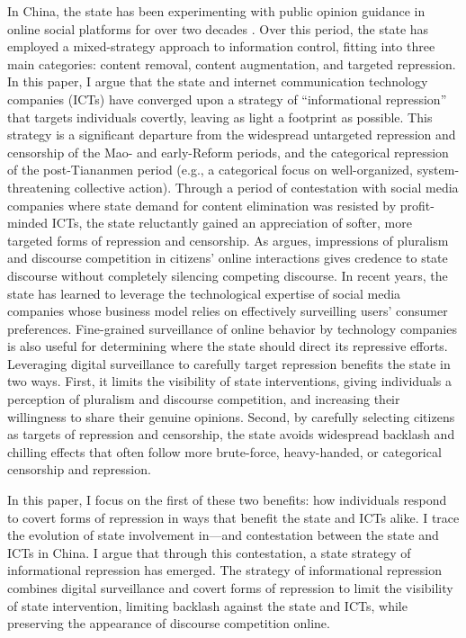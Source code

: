 \documentclass[11pt]{article}
\begin{document}
In China, the state has been experimenting with public opinion guidance in online social platforms for over two decades \citep{wei2015gongan,zou2015wangluo,xie2011zhongguo,xie2018zhongguo}. Over this period, the state has employed a mixed-strategy approach to information control, fitting into three main categories: content removal, content augmentation, and targeted repression. In this paper, I argue that the state and internet communication technology companies (ICTs) have converged upon a strategy of ``informational repression'' that targets individuals covertly, leaving as light a footprint as possible. This strategy is a significant departure from the widespread untargeted repression and censorship of the Mao- and early-Reform periods, and the categorical repression of the post-Tiananmen period (e.g., a categorical focus on well-organized, system-threatening collective action). Through a period of contestation with social media companies where state demand for content elimination was resisted by profit-minded ICTs, the state reluctantly gained an appreciation of softer, more targeted forms of repression and censorship. As \citep{han2018contesting} argues, impressions of pluralism and discourse competition in citizens' online interactions gives credence to state discourse without completely silencing competing discourse. In recent years, the state has learned to leverage the technological expertise of social media companies whose business model relies on effectively surveilling users' consumer preferences. Fine-grained surveillance of online behavior by technology companies is also useful for determining where the state should direct its repressive efforts. Leveraging digital surveillance to carefully target repression benefits the state in two ways. First, it limits the visibility of state interventions, giving individuals a perception of pluralism and discourse competition, and increasing their willingness to share their genuine opinions. Second, by carefully selecting citizens as targets of repression and censorship, the state avoids widespread backlash and chilling effects that often follow more brute-force, heavy-handed, or categorical censorship and repression.

In this paper, I focus on the first of these two benefits: how individuals respond to covert forms of repression in ways that benefit the state and ICTs alike. I trace the evolution of state involvement in—and contestation between the state and ICTs in China. I argue that through this contestation, a state strategy of informational repression has emerged. The strategy of informational repression combines digital surveillance and covert forms of repression to limit the visibility of state intervention, limiting backlash against the state and ICTs, while preserving the appearance of discourse competition online.
\end{document}
